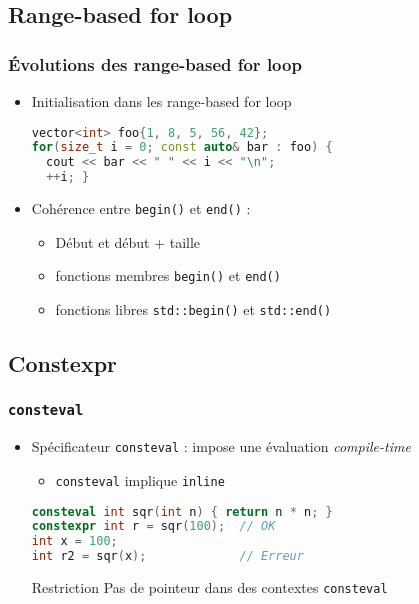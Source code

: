 \documentclass[C++.tex]{subfiles}
\begin{document}
\subsection*{Range-based for loop}
\begin{frame}[fragile]
	\frametitle{Évolutions des range-based for loop}
	\begin{itemize}
		\item Initialisation dans les range-based for loop

		\begin{lstlisting}[language=C++]
vector<int> foo{1, 8, 5, 56, 42};
for(size_t i = 0; const auto& bar : foo) {
  cout << bar << " " << i << "\n";
  ++i; }\end{lstlisting}

		\item Cohérence entre \lstinline|begin()| et \lstinline|end()| :
		\begin{itemize}
			\item \og Début\fg{} et \og début + taille\fg{}
			\item fonctions membres \lstinline|begin()| et \lstinline|end()|
			\item fonctions libres \lstinline|std::begin()| et \lstinline|std::end()|
		\end{itemize}

	\end{itemize}
\end{frame}

\subsection*{Constexpr}
\begin{frame}[fragile]
	\frametitle{\lstinline|consteval|}
	\begin{itemize}
		\item Spécificateur \lstinline|consteval| : impose une évaluation \textit{compile-time}


		\begin{itemize}
			\item \lstinline|consteval| implique \lstinline|inline|
		\end{itemize}

		\begin{lstlisting}[language=C++]
consteval int sqr(int n) { return n * n; }
constexpr int r = sqr(100);  // OK
int x = 100;
int r2 = sqr(x);             // Erreur\end{lstlisting}

		\begin{alertblock}{Restriction}
			Pas de pointeur dans des contextes \lstinline|consteval|
		\end{alertblock}
	\end{itemize}
\end{frame}
\end{document}
